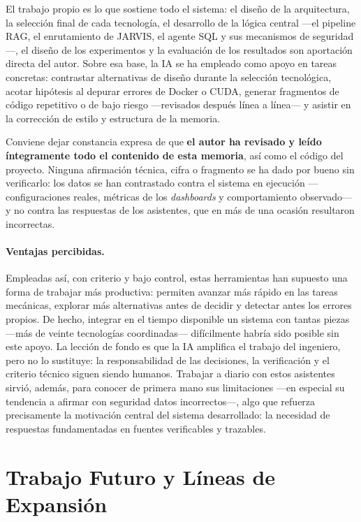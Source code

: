 El trabajo propio es lo que sostiene todo el sistema: el diseño de la arquitectura, la selección final de cada tecnología, el desarrollo de la lógica central ---el pipeline RAG, el enrutamiento de JARVIS, el agente SQL y sus mecanismos de seguridad---, el diseño de los experimentos y la evaluación de los resultados son aportación directa del autor. Sobre esa base, la IA se ha empleado como apoyo en tareas concretas: contrastar alternativas de diseño durante la selección tecnológica, acotar hipótesis al depurar errores de Docker o CUDA, generar fragmentos de código repetitivo o de bajo riesgo ---revisados después línea a línea--- y asistir en la corrección de estilo y estructura de la memoria.

Conviene dejar constancia expresa de que \textbf{el autor ha revisado y leído íntegramente todo el contenido de esta memoria}, así como el código del proyecto. Ninguna afirmación técnica, cifra o fragmento se ha dado por bueno sin verificarlo: los datos se han contrastado contra el sistema en ejecución ---configuraciones reales, métricas de los \textit{dashboards} y comportamiento observado--- y no contra las respuestas de los asistentes, que en más de una ocasión resultaron incorrectas.

\paragraph{Ventajas percibidas.} Empleadas así, con criterio y bajo control, estas herramientas han supuesto una forma de trabajar más productiva: permiten avanzar más rápido en las tareas mecánicas, explorar más alternativas antes de decidir y detectar antes los errores propios. De hecho, integrar en el tiempo disponible un sistema con tantas piezas ---más de veinte tecnologías coordinadas--- difícilmente habría sido posible sin este apoyo. La lección de fondo es que la IA amplifica el trabajo del ingeniero, pero no lo sustituye: la responsabilidad de las decisiones, la verificación y el criterio técnico siguen siendo humanos. Trabajar a diario con estos asistentes sirvió, además, para conocer de primera mano sus limitaciones ---en especial su tendencia a afirmar con seguridad datos incorrectos---, algo que refuerza precisamente la motivación central del sistema desarrollado: la necesidad de respuestas fundamentadas en fuentes verificables y trazables.

\section{Trabajo Futuro y Líneas de Expansión}


